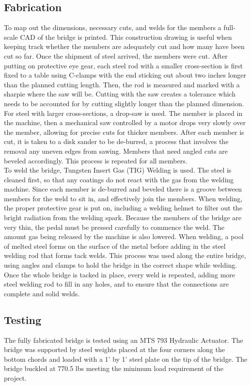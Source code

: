 \documentclass{article}
\begin{document}
    \subsection{Fabrication}
    \indent To map out the dimensions, necessary cuts, and welds for the members a full-scale CAD of the bridge is printed. This construction drawing is useful when keeping track whether the members are adequately cut and how many have been cut so far. Once the shipment of steel arrived, the members were cut. After putting on protective eye gear, each steel rod with a smaller cross-section is first fixed to a table using C-clamps with the end sticking out about two inches longer than the planned cutting length. Then, the rod is measured and marked with a sharpie where the saw will be. Cutting with the saw creates a tolerance which needs to be accounted for by cutting slightly longer than the planned dimension. For steel with larger cross-sections, a drop-saw is used. The member is placed in the machine, then a mechanical saw controlled by a motor drops very slowly over the member, allowing for precise cuts for thicker members. After each member is cut, it is taken to a disk sander to be de-burred, a process that involves the removal any uneven edges from sawing. Members that need angled cuts are beveled accordingly. This process is repeated for all members. \\
    \indent To weld the bridge, Tungsten Insert Gas (TIG) Welding is used. The steel is cleaned first, so that any coatings do not react with the gas from the welding machine. Since each member is de-burred and beveled there is a groove between members for the weld to sit in, and effectively join the members. When welding, the proper protective gear is put on, including a welding helmet to filter out the bright radiation from the welding spark. Because the members of the bridge are very thin, the pedal must be pressed carefully to commence the weld. The amount gas being released by the machine is also lowered. When welding, a pool of melted steel forms on the surface of the metal before adding in the steel welding rod that forms tack welds. This process was used along the entire bridge, using angles and clamps to hold the bridge in the correct shape while welding. Once the whole bridge is tacked in place, every weld is repeated, adding more steel welding rod to fill in any holes, and to ensure that the connections are complete and solid welds. 
    \subsection{Testing}
    \indent The fully fabricated bridge is tested using an MTS 793 Hydraulic Actuator. The bridge was supported by steel weights placed at the four corners along the bottom chords and loaded with a 1' by 1' steel plate on the tip of the bridge. The bridge buckled at 770.5 lbs meeting the minimum load requirement of the project. 
    \newpage
\end{document}
